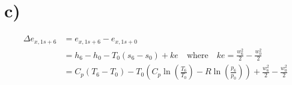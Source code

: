 

\section*{c)}

\begin{align*}
    \Delta e_{x,1s+6} &= e_{x,1s+6} - e_{x,1s+0} \\
    &= h_6 - h_0 - T_0 (s_6 - s_0) + ke \quad \text{where} \quad ke = \frac{w_6^2}{2} - \frac{w_0^2}{2} \\
    &= C_p (T_6 - T_0) - T_0 \left( C_p \ln \left( \frac{T_6}{T_0} \right) - R \ln \left( \frac{p_6}{p_0} \right) \right) + \frac{w_6^2}{2} - \frac{w_0^2}{2}
\end{align*}